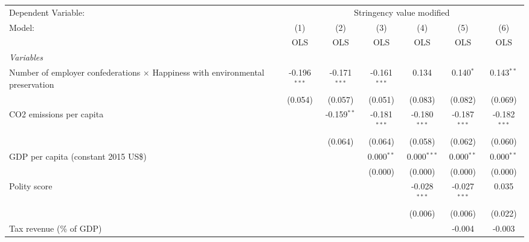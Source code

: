 
\begingroup
\centering
\begin{tabular}{lcccccc}
   \toprule
   Dependent Variable: & \multicolumn{6}{c}{Stringency value modified}\\
   Model:                                                                                & (1)            & (2)            & (3)            & (4)            & (5)            & (6)\\  
                                                                                         &  OLS           & OLS            & OLS            & OLS            & OLS            & OLS\\  
   \midrule
   \emph{Variables}\\
   Number of employer confederations $\times$ Happiness with environmental preservation  & -0.196$^{***}$ & -0.171$^{***}$ & -0.161$^{***}$ & 0.134          & 0.140$^{*}$    & 0.143$^{**}$\\   
                                                                                         & (0.054)        & (0.057)        & (0.051)        & (0.083)        & (0.082)        & (0.069)\\   
   CO2 emissions per capita                                                              &                & -0.159$^{**}$  & -0.181$^{***}$ & -0.180$^{***}$ & -0.187$^{***}$ & -0.182$^{***}$\\   
                                                                                         &                & (0.064)        & (0.064)        & (0.058)        & (0.062)        & (0.060)\\   
   GDP per capita (constant 2015 US\$)                                                   &                &                & 0.000$^{**}$   & 0.000$^{***}$  & 0.000$^{**}$   & 0.000$^{**}$\\   
                                                                                         &                &                & (0.000)        & (0.000)        & (0.000)        & (0.000)\\   
   Polity score                                                                          &                &                &                & -0.028$^{***}$ & -0.027$^{***}$ & 0.035\\   
                                                                                         &                &                &                & (0.006)        & (0.006)        & (0.022)\\   
   Tax revenue (\% of GDP)                                                               &                &                &                &                & -0.004         & -0.003\\   

\end{tabular}
